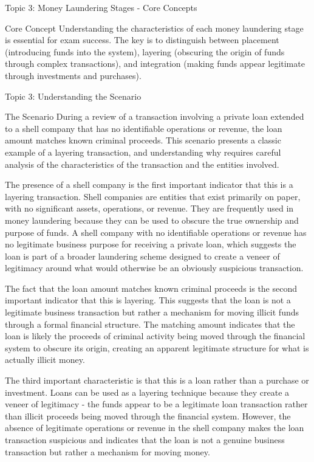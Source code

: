 \documentclass[5pt]{beamer}
\begin{document}
\begin{frame}{Topic 3: Money Laundering Stages - Core Concepts}
		\begin{alertblock}{Core Concept}
			\tiny Understanding the characteristics of each money laundering stage is essential for exam success. The key is to distinguish between placement (introducing funds into the system), layering (obscuring the origin of funds through complex transactions), and integration (making funds appear legitimate through investments and purchases).
		\end{alertblock}
	\end{frame}
	
	\begin{frame}{Topic 3: Understanding the Scenario}
		\begin{block}{\tiny The Scenario}
			\tiny During a review of a transaction involving a private loan extended to a shell company that has no identifiable operations or revenue, the loan amount matches known criminal proceeds. This scenario presents a classic example of a layering transaction, and understanding why requires careful analysis of the characteristics of the transaction and the entities involved.
			
			The presence of a shell company is the first important indicator that this is a layering transaction. Shell companies are entities that exist primarily on paper, with no significant assets, operations, or revenue. They are frequently used in money laundering because they can be used to obscure the true ownership and purpose of funds. A shell company with no identifiable operations or revenue has no legitimate business purpose for receiving a private loan, which suggests the loan is part of a broader laundering scheme designed to create a veneer of legitimacy around what would otherwise be an obviously suspicious transaction.
			
			The fact that the loan amount matches known criminal proceeds is the second important indicator that this is layering. This suggests that the loan is not a legitimate business transaction but rather a mechanism for moving illicit funds through a formal financial structure. The matching amount indicates that the loan is likely the proceeds of criminal activity being moved through the financial system to obscure its origin, creating an apparent legitimate structure for what is actually illicit money.
			
			The third important characteristic is that this is a loan rather than a purchase or investment. Loans can be used as a layering technique because they create a veneer of legitimacy - the funds appear to be a legitimate loan transaction rather than illicit proceeds being moved through the financial system. However, the absence of legitimate operations or revenue in the shell company makes the loan transaction suspicious and indicates that the loan is not a genuine business transaction but rather a mechanism for moving money.
		\end{block}
	\end{frame}
	
\end{document}
